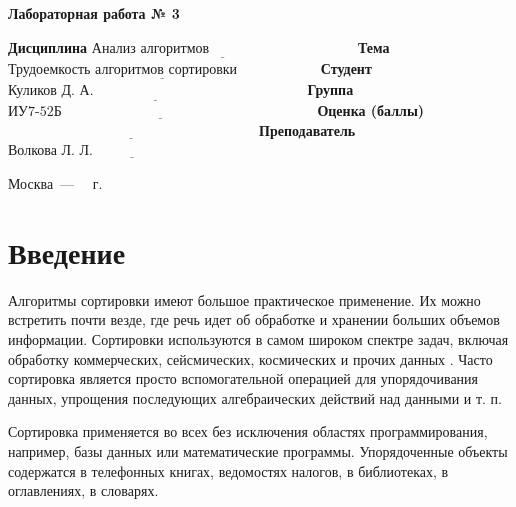 \documentclass[12pt]{report}
\begin{document}
\begin{center}
\Large\textbf{Лабораторная работа № 3}
\end{center}
\vspace{\baselineskip}
\noindent\textbf{Дисциплина} $\underline{\text{Анализ алгоритмов~~~~~~~~~~~~~~~~~~~~~~~~~~~~~~~}}$\newline\newline
\noindent\textbf{Тема} $\underline{\text{Трудоемкость алгоритмов сортировки~~~~~~~~~~~~~~~~~}}$\newline\newline
\noindent\textbf{Студент} $\underline{\text{Куликов Д. А.~~~~~~~~~~~~~~~~~~~~~~~~~~~~~~~~~~~~~~~~~~~~~}}$\newline\newline
\noindent\textbf{Группа} $\underline{\text{ИУ7-52Б~~~~~~~~~~~~~~~~~~~~~~~~~~~~~~~~~~~~~~~~~~~~~~~~~~~~~~}}$\newline\newline
\noindent\textbf{Оценка (баллы)} $\underline{\text{~~~~~~~~~~~~~~~~~~~~~~~~~~~~~~~~~~~~~~~~~~~~~~~~~~~~~}}$\newline\newline
\noindent\textbf{Преподаватель} $\underline{\text{Волкова Л. Л.~~~~~~~~~~~~~~~~~~~~~~~~~~~~~~~~~~~}}$\newline

\begin{center}
	\vfill
	Москва~---~\the\year
	~г.
\end{center}
\clearpage

\tableofcontents

\newpage
\chapter*{Введение}
Алгоритмы сортировки имеют большое практическое применение.
Их можно встретить почти везде, где речь идет об обработке и хранении больших объемов информации.
Сортировки используются в самом широком спектре задач, включая обработку коммерческих, сейсмических, космических и прочих данных \cite{academy}.
Часто сортировка является просто вспомогательной операцией для упорядочивания данных, упрощения последующих алгебраических действий над данными и т. п.

Сортировка применяется во всех без исключения областях программирования, например, базы данных или математические программы.
Упорядоченные объекты содержатся в телефонных книгах, ведомостях налогов, в библиотеках, в оглавлениях, в словарях.
\end{document}
